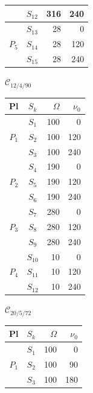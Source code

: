 \begin{table}[H]
\begin{minipage}[t]{0.32\linewidth}
\begin{tabular}{c c r r}
                        & $S_{12}$ & 316 & 240 \\
\midrule
\multirow{3}{*}{$P_5$} & $S_{13}$ &  28 &   0 \\
                        & $S_{14}$ &  28 & 120 \\
                        & $S_{15}$ &  28 & 240 \\
\bottomrule
\end{tabular}
\end{minipage}%
\hfill
\begin{minipage}[t]{0.32\linewidth}
\centering
\textbf{$\mathcal{C}_{12/4/90}$}\\[2pt]
\begin{tabular}{c c r r}
\toprule
Pl & $S_k$ & $\Omega$ & $\nu_0$ \\
\midrule
\multirow{3}{*}{$P_1$} & $S_1$  & 100 &   0 \\
                        & $S_2$  & 100 & 120 \\
                        & $S_3$  & 100 & 240 \\
\midrule
\multirow{3}{*}{$P_2$} & $S_4$  & 190 &   0 \\
                        & $S_5$  & 190 & 120 \\
                        & $S_6$  & 190 & 240 \\
\midrule
\multirow{3}{*}{$P_3$} & $S_7$  & 280 &   0 \\
                        & $S_8$  & 280 & 120 \\
                        & $S_9$  & 280 & 240 \\
\midrule
\multirow{3}{*}{$P_4$} & $S_{10}$ &  10 &   0 \\
                        & $S_{11}$ &  10 & 120 \\
                        & $S_{12}$ &  10 & 240 \\
\bottomrule
\end{tabular}
\end{minipage}%
\hfill
\begin{minipage}[t]{0.32\linewidth}
\centering
\textbf{$\mathcal{C}_{20/5/72}$}\\[2pt]
\begin{tabular}{c c r r}
\toprule
Pl & $S_k$ & $\Omega$ & $\nu_0$ \\
\midrule
\multirow{4}{*}{$P_1$} & $S_1$  & 100 &   0 \\
                        & $S_2$  & 100 &  90 \\
                        & $S_3$  & 100 & 180 \\

\end{tabular}
\end{minipage}
\end{table}
